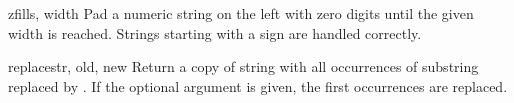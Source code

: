 \begin{funcdesc}{zfill}{s, width}
  Pad a numeric string on the left with zero digits until the given
  width is reached.  Strings starting with a sign are handled
  correctly.
\end{funcdesc}

\begin{funcdesc}{replace}{str, old, new}
  Return a copy of string  with all occurrences of substring
   replaced by .  If the optional argument
   is given, the first  occurrences are
  replaced.
\end{funcdesc}
